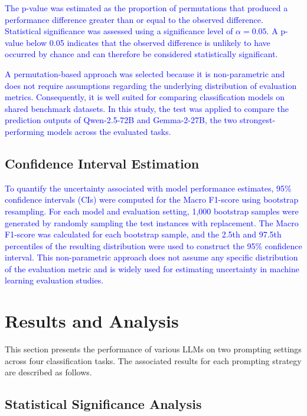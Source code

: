 \documentclass[10pt,letterpaper]{article}
\newcommand{\rev}[1]{\textcolor{blue}{#1}}
\begin{document}
\rev{The p-value was estimated as the proportion of permutations that produced a performance difference greater than or equal to the observed difference. Statistical significance was assessed using a significance level of $\alpha = 0.05$. A p-value below 0.05 indicates that the observed difference is unlikely to have occurred by chance and can therefore be considered statistically significant.}

\rev{A permutation-based approach was selected because it is non-parametric and does not require assumptions regarding the underlying distribution of evaluation metrics. Consequently, it is well suited for comparing classification models on shared benchmark datasets. In this study, the test was applied to compare the prediction outputs of Qwen-2.5-72B and Gemma-2-27B, the two strongest-performing models across the evaluated tasks.}

\subsection*{Confidence Interval Estimation}
\label{sec:confidence_interval}

\rev{To quantify the uncertainty associated with model performance estimates, 95\% confidence intervals (CIs) were computed for the Macro F1-score using bootstrap resampling. For each model and evaluation setting, 1,000 bootstrap samples were generated by randomly sampling the test instances with replacement. The Macro F1-score was calculated for each bootstrap sample, and the 2.5th and 97.5th percentiles of the resulting distribution were used to construct the 95\% confidence interval. This non-parametric approach does not assume any specific distribution of the evaluation metric and is widely used for estimating uncertainty in machine learning evaluation studies.}



\section*{Results and Analysis}
\label{sec:results}

This section presents the performance of various LLMs on two prompting settings across four classification tasks. The associated results for each prompting strategy are described as follows.

\subsection*{Statistical Significance Analysis}
\end{document}
